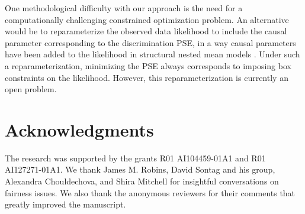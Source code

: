 \documentclass[letterpaper]{article} %
\newcommand{\citep}{\cite}
\begin{document}
One methodological difficulty with our approach is the need for a computationally challenging constrained optimization problem.
An alternative would be to reparameterize the observed data likelihood to include the causal parameter corresponding to the discrimination PSE, in a way causal parameters have been added to the likelihood in structural nested mean models \citep{robins99marginal}.  Under such a reparameterization, minimizing the PSE always corresponds to imposing box constraints on the likelihood.  However, this reparameterization is currently an open problem. 

\section{Acknowledgments}
The research was supported by the grants R01 AI104459-01A1 and R01 AI127271-01A1.  We thank James M. Robins, David Sontag and his group, Alexandra Chouldechova, and Shira Mitchell for insightful conversations on fairness issues.  We also thank the anonymous reviewers for their comments that greatly improved the manuscript. 

{\small


}
\end{document}
